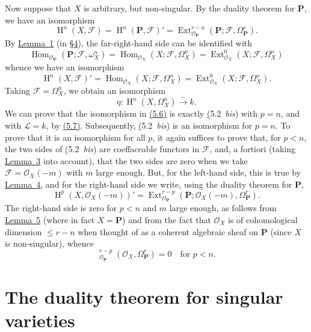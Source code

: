 \documentclass{article}
\newcommand{\scr}[1]{{\mathscr{#1}}}
\newcommand{\bb}{\mathbf}
\renewcommand{\leq}{\leqslant}
\DeclareMathOperator{\Ext}{Ext}
\DeclareMathOperator{\Hom}{Hom}
\DeclareMathOperator{\shExt}{\underline{Ext}}
\DeclareMathOperator{\HH}{H}
\newcommand{\oldpage}[1]{\marginpar{\footnotesize$\Big\vert$ \textit{p.~#1}}}
\begin{document}
Now suppose that $X$ is arbitrary, but non-singular.
By the duality theorem for $\bb{P}$, we have an isomorphism
\[
  \HH^n(X,\scr{F})
  = \HH^n(\bb{P},\scr{F})'
  = \Ext_{\scr{O}_\bb{P}}^{r-n}(\bb{P};\scr{F},\Omega_\bb{P}^r).
\]
By \hyperref[lemma1]{Lemma~1} (in \hyperref[section4]{\S4}), the far-right-hand side can be identified with
\[
  \Hom_{\scr{O}_\bb{P}}(\bb{P};\scr{F},\omega_X^n)
  = \Hom_{\scr{O}_X}(X;\scr{F},\Omega_X^n)
  = \Ext_{\scr{O}_X}^0(X;\scr{F},\Omega_X^n)
\]
whence we have an isomorphism
\[
\label{5.6}
  \HH^n(X,\scr{F})'
  = \Hom_{\scr{O}_X}(X;\scr{F},\Omega_X^n)
  = \Ext_{\scr{O}_X}^0(X;\scr{F},\Omega_X^n).
\tag{5.6}
\]
Taking $\scr{F}=\Omega_X^n$, we obtain an isomorphism
\[
\label{5.7}
  \eta\colon \HH^n(X,\Omega_X^n) \xrightarrow{\sim} k.
\tag{5.7}
\]
\oldpage{149-17}
We can prove that the isomorphism in \hyperref[5.6]{(5.6)} is exactly \hyperref[5.2bis](5.2~\emph{bis}) with $p=n$, and with $\scr{L}=k$, by \hyperref[5.7]{(5.7)}.
Subsequently, \hyperref[5.2bis](5.2~\emph{bis}) is an isomorphism for $p=n$.
To prove that it is an isomorphism for all $p$, it again suffices to prove that, for $p<n$, the two sides of \hyperref[5.2bis](5.2~\emph{bis}) are coeffaceable functors in $\scr{F}$, and, a fortiori (taking \hyperref[lemma3]{Lemma~3} into account), that the two sides are zero when we take $\scr{F}=\scr{O}_X(-m)$ with $m$ large enough.
But, for the left-hand side, this is true by \hyperref[lemma4]{Lemma~4}, and for the right-hand side we write, using the duality theorem for $\bb{P}$,
\[
  \HH^p(X,\scr{O}_X(-m))'
  = \Ext_{\scr{O}_\bb{P}}^{r-p}(\bb{P};\scr{O}_X(-m),\Omega_\bb{P}^r).
\]
The right-hand side is zero for $p<n$ and $m$ large enough, as follows from \hyperref[lemma5]{Lemma~5} (where in fact $X=\bb{P}$) and from the fact that $\scr{O}_X$ is of cohomological dimension $\leq r-n$ when thought of as a coherent algebraic sheaf on $\bb{P}$ (since $X$ is non-singular), whence
\[
  \shExt_{\scr{O}_\bb{P}}^{r-p}(\scr{O}_X,\Omega_\bb{P}^r) = 0
  \quad\mbox{for $p<n$.}
\]


\section{The duality theorem for singular varieties}
\label{section6}
\end{document}
